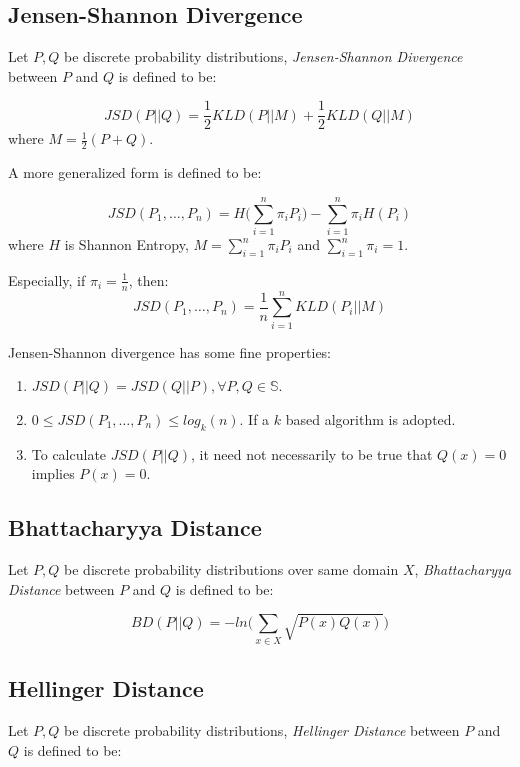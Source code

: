 \documentclass[10pt,conference,letterpaper]{article}
\begin{document}
		\subsection{Jensen-Shannon Divergence}
			Let $P,Q$ be discrete probability distributions, \textit{Jensen-Shannon Divergence} between $P$ and $Q$ is defined to be:
	
			\begin{equation}
				JSD(P||Q) = \frac{1}{2}KLD(P||M) + \frac{1}{2}KLD(Q||M)
			\end{equation}
			where $\displaystyle M = \frac{1}{2}(P+Q)$.
	
			A more generalized form is defined to be:
			
			\begin{equation}
					JSD(P_1, \dots, P_n) = H\Big(\sum_{i=1}^n\pi_i P_i\Big) - \sum_{i=1}^n\pi_iH(P_i)
			\end{equation}
			where $H$ is Shannon Entropy, $\displaystyle M = \sum_{i=1}^{n}\pi_iP_i$ and $\displaystyle \sum_{i=1}^{n}\pi_i = 1$.
			
			Especially, if $\displaystyle \pi_i = \frac{1}{n}$, then:
			\begin{equation}
				JSD(P_1, \dots, P_n) = \frac{1}{n}\sum_{i=1}^{n}KLD(P_i||M)
			\end{equation}
	
			Jensen-Shannon divergence has some fine properties:
			\begin{enumerate}
				\item $JSD(P||Q) = JSD(Q||P), \forall P, Q\in \mathbb{S}$.
				\item $0 \le JSD(P_1, \dots, P_n) \le log_k(n)$. If a $k$ based algorithm is adopted.
				\item To calculate $JSD(P||Q)$, it need not necessarily to be true that $Q(x)=0$ implies $P(x)=0$.
			\end{enumerate}
			
		\subsection{Bhattacharyya Distance}
			Let $P,Q$ be discrete probability distributions over same domain $X$, \textit{Bhattacharyya Distance} between $P$ and $Q$ is defined to be:
			
			\begin{equation}
				BD(P||Q) = -ln\Big(\sum_{x\in X}\sqrt{P(x)Q(x)}\Big)
			\end{equation}
		
		\subsection{Hellinger Distance}
			Let $P,Q$ be discrete probability distributions, \textit{Hellinger Distance} between $P$ and $Q$ is defined to be:
			
\end{document}
